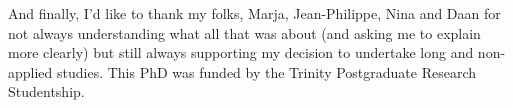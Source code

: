 And finally, I'd like to thank my folks, Marja, Jean-Philippe, Nina and Daan for not always understanding what all that was about (and asking me to explain more clearly) but still always supporting my decision to undertake long and non-applied studies.
This PhD was funded by the Trinity Postgraduate Research Studentship.%


